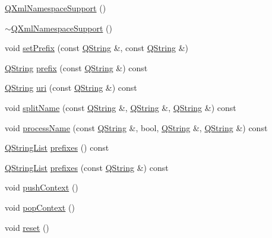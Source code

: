 \begin{DoxyCompactItemize}
\item 
\hyperlink{class_q_xml_namespace_support_a91945add078a281b3c05c5ed7ec29e67}{Q\-Xml\-Namespace\-Support} ()
\item 
\hyperlink{class_q_xml_namespace_support_a0af0f500daba06170d6b75377fafbcdf}{$\sim$\-Q\-Xml\-Namespace\-Support} ()
\item 
void \hyperlink{class_q_xml_namespace_support_ada78a4ed4212a7e5956a01cea19fc416}{set\-Prefix} (const \hyperlink{class_q_string}{Q\-String} \&, const \hyperlink{class_q_string}{Q\-String} \&)
\item 
\hyperlink{class_q_string}{Q\-String} \hyperlink{class_q_xml_namespace_support_a6234801283731e4cb01e275a93374ec3}{prefix} (const \hyperlink{class_q_string}{Q\-String} \&) const 
\item 
\hyperlink{class_q_string}{Q\-String} \hyperlink{class_q_xml_namespace_support_aca937387ce3699dbae070c53e8177730}{uri} (const \hyperlink{class_q_string}{Q\-String} \&) const 
\item 
void \hyperlink{class_q_xml_namespace_support_a33396201821f86d378bb05dbee5613d5}{split\-Name} (const \hyperlink{class_q_string}{Q\-String} \&, \hyperlink{class_q_string}{Q\-String} \&, \hyperlink{class_q_string}{Q\-String} \&) const 
\item 
void \hyperlink{class_q_xml_namespace_support_a56a0e02b6ab12fc0cb16d5cf4047e1d4}{process\-Name} (const \hyperlink{class_q_string}{Q\-String} \&, bool, \hyperlink{class_q_string}{Q\-String} \&, \hyperlink{class_q_string}{Q\-String} \&) const 
\item 
\hyperlink{class_q_string_list}{Q\-String\-List} \hyperlink{class_q_xml_namespace_support_ad3b61f2e54b788ad84b85a0150fbbe3b}{prefixes} () const 
\item 
\hyperlink{class_q_string_list}{Q\-String\-List} \hyperlink{class_q_xml_namespace_support_ada2e20e99e2a9df78cac2e512aeb045e}{prefixes} (const \hyperlink{class_q_string}{Q\-String} \&) const 
\item 
void \hyperlink{class_q_xml_namespace_support_a8145f4a61c1cc91d165269a14c95bc87}{push\-Context} ()
\item 
void \hyperlink{class_q_xml_namespace_support_ae6d781cbeaaf441551c7c0f6f2bec1e9}{pop\-Context} ()
\item 
void \hyperlink{class_q_xml_namespace_support_ad20897c5c8bd47f5d4005989bead0e55}{reset} ()
\end{DoxyCompactItemize}


